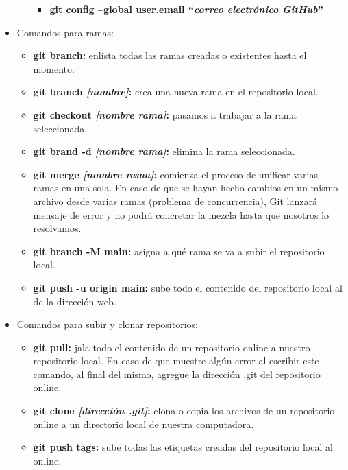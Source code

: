 \begin{itemize}
\begin{itemize}
\begin{itemize}
            \item \textbf{git config –global user.email “\textit{correo electrónico GitHub}”}
        \end{itemize}
    \end{itemize}
    \item Comandos para ramas:
    \begin{itemize}
        \item \textbf{git branch:} enlista todas las ramas creadas o existentes hasta el momento.
        \item \textbf{git branch \textit{[nombre]}:} crea una nueva rama en el repositorio local.
        \item \textbf{git checkout \textit{[nombre rama]}:} pasamos a trabajar a la rama seleccionada.
        \item \textbf{git brand -d \textit{[nombre rama]}:} elimina la rama seleccionada.
        \item \textbf{git merge \textit{[nombre rama]}:} comienza el proceso de unificar varias ramas en una sola. En caso de que se hayan hecho cambios en un mismo archivo desde varias ramas (problema de concurrencia), Git lanzará mensaje de error y no podrá concretar la mezcla hasta que nosotros lo resolvamos.
        \item \textbf{git branch -M main: }asigna a qué rama se va a subir el repositorio local.
        \item \textbf{git push -u origin main:} sube todo el contenido del repositorio local al de la dirección web.
    \end{itemize}
    \item Comandos para subir y clonar repositorios:
    \begin{itemize}
        \item \textbf{git pull:} jala todo el contenido de un repositorio online a nuestro repositorio local. En caso de que muestre algún error al escribir este comando, al final del mismo, agregue la dirección .git del repositorio online.
        \item \textbf{git clone \textit{[dirección .git]}:} clona o copia los archivos de un repositorio online a un directorio local de nuestra computadora.
        \item \textbf{git push tags: }sube todas las etiquetas creadas del repositorio local al online.
    \end{itemize}
\end{itemize}






